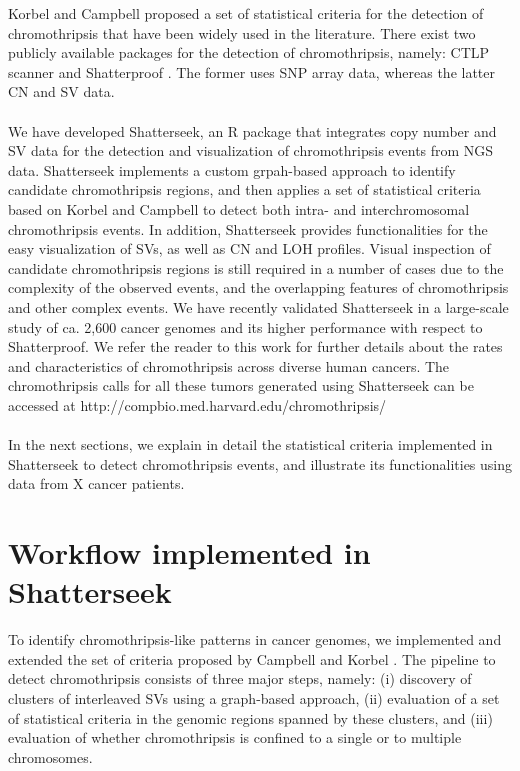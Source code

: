 \documentclass[twoside,a4wide,11pt]{article}\usepackage[]{graphicx}\usepackage[]{color}
\begin{document}
Korbel and Campbell \cite{Korbel2013} proposed a set of statistical criteria for the detection of chromothripsis that have been widely used in the literature. 
There exist two publicly available packages for the detection of chromothripsis, namely: 
CTLP scanner \cite{Cai2014,Yang2016} and Shatterproof \cite{Govind2014}.
The former uses SNP array data, whereas the latter CN and SV data.\\
\\
We have developed Shatterseek, an R package that integrates copy number and SV data for the detection and 
visualization of chromothripsis events from NGS data.
Shatterseek implements a custom grpah-based approach to identify candidate chromothripsis regions, 
and then applies a set of statistical criteria based on Korbel and Campbell \cite{Korbel2013}
to detect both intra- and interchromosomal chromothripsis events.
In addition, Shatterseek provides functionalities for the easy visualization of SVs, as well as CN and LOH profiles.
Visual inspection of candidate chromothripsis regions is still required in a number of cases due to the complexity of the observed events, and the overlapping features of chromothripsis and other complex events.
We have recently validated Shatterseek in a large-scale
study of ca. 2,600 cancer genomes and its higher performance with respect to Shatterproof.
We refer the reader to this work for further details about the rates and characteristics of chromothripsis across diverse human cancers.
The chromothripsis calls for all these tumors generated using Shatterseek can be accessed at 
http://compbio.med.harvard.edu/chromothripsis/ \\
\\
In the next sections, we explain in detail the statistical criteria implemented in Shatterseek to detect
chromothripsis events,
and illustrate its functionalities using data from X cancer patients.

\section{Workflow implemented in Shatterseek}
To identify chromothripsis-like patterns in cancer genomes, we implemented and extended 
the set of  criteria proposed by Campbell and Korbel \cite{Korbel2013}. 
The pipeline to detect chromothripsis consists of three major steps, namely:
(i) discovery of clusters of interleaved SVs using a graph-based approach,
(ii) evaluation of a set of statistical criteria in the genomic regions spanned by these clusters,
and (iii) evaluation of whether chromothripsis is confined to a single or to multiple chromosomes.\\
\\
\end{document}
